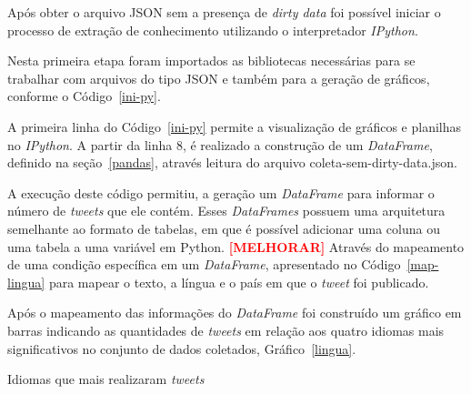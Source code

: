 Após obter o arquivo JSON sem a presença de \textit{dirty data} foi possível iniciar o processo de extração de conhecimento utilizando o interpretador \textit{IPython}.

Nesta primeira etapa foram importados as bibliotecas necessárias para se trabalhar com arquivos do tipo JSON e também para a geração de gráficos, conforme o Código~\ref{ini-py}.



A primeira linha do Código~\ref{ini-py} permite a visualização de gráficos e planilhas no \textit{IPython}. A partir da linha 8, é realizado a construção de um \textit{DataFrame}, definido na seção~\ref{pandas}, através leitura do arquivo coleta-sem-dirty-data.json.

A execução deste código permitiu, a geração um \textit{DataFrame} para informar o número de \textit{tweets} que ele contém. Esses \textit{DataFrames} possuem uma arquitetura semelhante ao formato de tabelas, em que é possível adicionar uma coluna ou uma tabela a uma variável em Python. \textbf{\textcolor{red}{[MELHORAR]}} Através do mapeamento de uma condição específica em um \textit{DataFrame}, apresentado no Código~\ref{map-lingua} para mapear o texto, a língua e o país em que o \textit{tweet} foi publicado.



Após o mapeamento das informações do \textit{DataFrame} foi construído um gráfico em barras indicando as quantidades de \textit{tweets} em relação aos quatro idiomas mais significativos no conjunto de dados coletados, Gráfico~\ref{lingua}.

\begin{grafico}[h]
	\centering
	\caption{Idiomas que mais realizaram \textit{tweets}}
	\vspace{-0.3cm}
	\label{lingua}
\end{grafico}

